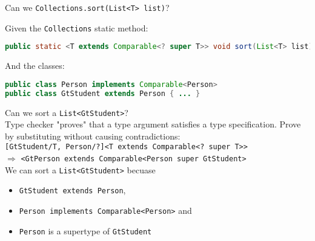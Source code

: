 \documentclass{beamer}
\begin{document}
\begin{frame}[fragile]{Can we {\tt Collections.sort(List<T> list)}?}

\vspace{-.05in}
Given the {\tt Collections} static method:
\begin{lstlisting}[language=Java]
public static <T extends Comparable<? super T>> void sort(List<T> list)
\end{lstlisting}
\vspace{-.05in}
And the classes:
\vspace{-.05in}
\begin{lstlisting}[language=Java]
public class Person implements Comparable<Person>
public class GtStudent extends Person { ... }
\end{lstlisting}
\vspace{-.05in}
Can we sort a {\tt List<GtStudent>}?\\
\vspace{.05in}
Type checker "proves" that a type argument satisfies a type specification.  Prove by substituting without causing contradictions:\\
\vspace{.05in}
\small
{\tt [GtStudent/T, Person/?]<T extends Comparable<? super T>>}\\
$\Rightarrow$ {\tt <GtPerson extends Comparable<Person super GtStudent>}
\normalsize
\\
\vspace{.05in}
We can sort a {\tt List<GtStudent>} becuase
\begin{itemize}
\item {\tt GtStudent extends Person},
\item {\tt Person implements Comparable<Person>} and
\item {\tt Person} is a supertype of {\tt GtStudent}
\end{itemize}

\end{frame}
\end{document}
